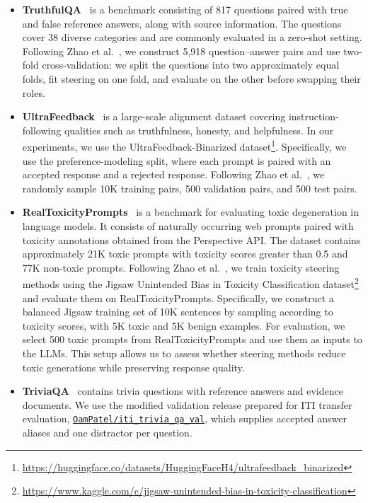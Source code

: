 \begin{itemize}
    \item \textbf{TruthfulQA}~\citep{lin2021truthfulqa} is a benchmark consisting of 817 questions paired with true and false reference answers, along with source information. The questions cover 38 diverse categories and are commonly evaluated in a zero-shot setting. Following Zhao et al.~\cite{zhaoodesteer}, we construct 5,918 question--answer pairs and use two-fold cross-validation: we split the questions into two approximately equal folds, fit steering on one fold, and evaluate on the other before swapping their roles.

    \item \textbf{UltraFeedback}~\citep{cui2023ultrafeedback} is a large-scale alignment dataset covering instruction-following qualities such as truthfulness, honesty, and helpfulness. In our experiments, we use the UltraFeedback-Binarized dataset\footnote{\url{https://huggingface.co/datasets/HuggingFaceH4/ultrafeedback_binarized}}. Specifically, we use the preference-modeling split, where each prompt is paired with an accepted response and a rejected response. Following Zhao et al.~\cite{zhaoodesteer}, we randomly sample 10K training pairs, 500 validation pairs, and 500 test pairs.

    \item \textbf{RealToxicityPrompts}~\citep{gehman2020realtoxicityprompts} is a benchmark for evaluating toxic degeneration in language models. It consists of naturally occurring web prompts paired with toxicity annotations obtained from the Perspective API. The dataset contains approximately 21K toxic prompts with toxicity scores greater than 0.5 and 77K non-toxic prompts. Following Zhao et al.~\citep{zhaoodesteer}, we train toxicity steering methods using the Jigsaw Unintended Bias in Toxicity Classification dataset\footnote{\url{https://www.kaggle.com/c/jigsaw-unintended-bias-in-toxicity-classification}} and evaluate them on RealToxicityPrompts. Specifically, we construct a balanced Jigsaw training set of 10K sentences by sampling according to toxicity scores, with 5K toxic and 5K benign examples. For evaluation, we select 500 toxic prompts from RealToxicityPrompts and use them as inputs to the LLMs. This setup allows us to assess whether steering methods reduce toxic generations while preserving response quality.

    \item \textbf{TriviaQA}~\citep{joshi2017triviaqa} contains trivia questions with reference answers and evidence documents. We use the modified validation release prepared for ITI transfer evaluation, \href{https://huggingface.co/datasets/OamPatel/iti_trivia_qa_val}{\texttt{OamPatel/iti\_trivia\_qa\_val}}, which supplies accepted answer aliases and one distractor per question.


\end{itemize}
